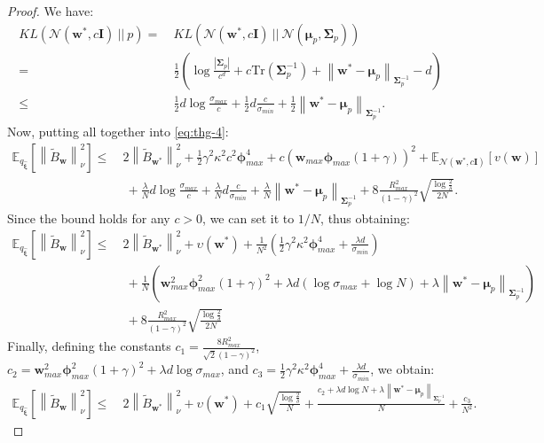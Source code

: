\documentclass{article}
\newcommand{\wt}[1]{\widetilde{#1}}
\newcommand{\wh}[1]{\widehat{#1}}
\newcommand{\norm}[1]{\left\lVert #1 \right\rVert}
\newcommand{\abs}[1]{\left\lvert #1 \right\rvert}
\begin{document}
\begin{proof}
We have:
\begin{align*}
KL\left(\mathcal{N}(\bm{w}^*,c\bm{I})\ ||\ p\right) =\ & KL\left(\mathcal{N}(\bm{w}^*,c\bm{I})\ ||\ \mathcal{N}(\bm{\mu}_p,\bm{\Sigma}_p)\right)\\ =\ & \frac{1}{2}\left( \log\frac{\abs{\bm{\Sigma}_p}}{c^d} + c\text{Tr}\left( \bm{\Sigma}_p^{-1}\right) + \norm{\bm{w}^* - \bm{\mu}_p}_{\bm{\Sigma}_p^{-1}} -d \right)\\ \leq\ & \frac{1}{2}d\log\frac{\sigma_{max}}{c} + \frac{1}{2}d\frac{c}{\sigma_{min}} + \frac{1}{2}\norm{\bm{w}^* - \bm{\mu}_p}_{\bm{\Sigma}_p^{-1}}.
\end{align*}
Now, putting all together into \eqref{eq:thg-4}:
\begin{align*}
\mathbb{E}_{q_{\wh{\bm{\xi}}}}\left[ \norm{\wt B_{\bm{w}}}_{\nu}^2 \right ] \leq\ & 2\norm{\wt{B}_{\bm{w}^{*}}}_{\nu}^2 + \frac{1}{2}\gamma^2\kappa^2 c^2\bm{\phi}_{max}^4 + c\left(\bm{w}_{max}\bm{\phi}_{max}(1 + \gamma)\right)^2 + \mathbb{E}_{\mathcal{N}(\bm{w}^*,c\bm{I})}\left[ v(\bm{w}) \right]\\ &\ + \frac{\lambda}{N}d\log\frac{\sigma_{max}}{c} + \frac{\lambda}{N}d\frac{c}{\sigma_{min}} + \frac{\lambda}{N}\norm{\bm{w}^* - \bm{\mu}_p}_{\bm{\Sigma}_p^{-1}} + 8\frac{R_{max}^2}{(1-\gamma)^2}\sqrt{\frac{\log\frac{2}{\delta}}{2N}}.
\end{align*}
Since the bound holds for any $c>0$, we can set it to $1/N$, thus obtaining:
\begin{align*}
\mathbb{E}_{q_{\wh{\bm{\xi}}}}\left[ \norm{\wt B_{\bm{w}}}_{\nu}^2 \right ] \leq\ & 2\norm{\wt{B}_{\bm{w}^{*}}}_{\nu}^2 + \upsilon(\bm{w}^*) + \frac{1}{N^2}\left(\frac{1}{2}\gamma^2\kappa^2\bm{\phi}_{max}^4 + \frac{\lambda d}{\sigma_{min}}\right)\\ &\ + \frac{1}{N}\left(\bm{w}_{max}^2\bm{\phi}_{max}^2(1 + \gamma)^2 + \lambda d (\log\sigma_{max} + \log N) + \lambda\norm{\bm{w}^* - \bm{\mu}_p}_{\bm{\Sigma}_p^{-1}} \right)\\ &\ + 8\frac{R_{max}^2}{(1-\gamma)^2}\sqrt{\frac{\log\frac{2}{\delta}}{2N}}
\end{align*}
Finally, defining the constants $c_1 = \frac{8R_{max}^2}{\sqrt{2}(1-\gamma)^2}$, $c_2 = \bm{w}_{max}^2\bm{\phi}_{max}^2(1 + \gamma)^2 + \lambda d \log\sigma_{max}$, and $c_3 = \frac{1}{2}\gamma^2\kappa^2\bm{\phi}_{max}^4 + \frac{\lambda d}{\sigma_{min}}$, we obtain:
\begin{align*}
\mathbb{E}_{q_{\wh{\bm{\xi}}}}\left[ \norm{\wt B_{\bm{w}}}_{\nu}^2 \right ] \leq\ & 2\norm{\wt{B}_{\bm{w}^{*}}}_{\nu}^2 + \upsilon(\bm{w}^*) + c_1\sqrt{\frac{\log\frac{2}{\delta}}{N}} + \frac{c_2 + \lambda d \log N + \lambda\norm{\bm{w}^* - \bm{\mu}_p}_{\bm{\Sigma}_p^{-1}}}{N} + \frac{c_3}{N^2}.

\end{align*}
\end{proof}
\end{document}
